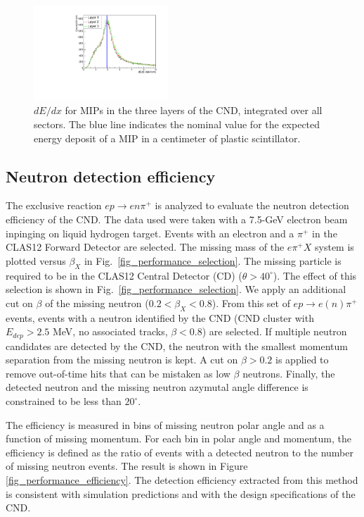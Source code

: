 \begin{figure}[htb]  
\begin{center}
\includegraphics[width=0.45\textwidth]{Figure/canENE.pdf}
\caption {$dE/dx$ for MIPs in the three layers of the CND, integrated over all sectors. The blue line indicates the nominal value for the expected energy deposit of a MIP in a centimeter of plastic scintillator.}
\label{fig_performance_edep}
\end{center}
\end{figure}

\subsection{Neutron detection efficiency}
The exclusive reaction $e p \rightarrow e n \pi^+$ is analyzed to evaluate the neutron detection efficiency of the CND. The data used were taken with a 7.5-GeV electron beam inpinging on liquid hydrogen target. Events with an electron and a $\pi^+$ in the CLAS12 Forward Detector are selected. The missing mass of the $e \pi^+ X$ system is plotted versus $\beta_X$ in Fig.~\ref{fig_performance_selection}. The missing particle is required to be in the CLAS12 Central Detector (CD) ($\theta>40^\circ$). The effect of this selection is shown in Fig.~\ref{fig_performance_selection}. We apply an additional cut on $\beta$ of the missing neutron ($0.2<\beta_X<0.8$). From this set of $e p \rightarrow e (n) \pi^+$ events, events with a neutron identified by the CND (CND cluster with $E_{dep}>2.5$ MeV, no associated tracks, $\beta<0.8$) are selected. If multiple neutron candidates are detected by the CND, the neutron with the smallest momentum separation from the missing neutron is kept. A cut on $\beta>0.2$ is applied to remove out-of-time hits that can be mistaken as low $\beta$ neutrons. Finally, the detected neutron and the missing neutron azymutal angle difference is constrained to be less than $20^\circ$.

The efficiency is measured in bins of missing neutron polar angle and as a function of missing momentum. For each bin in polar angle and momentum, the efficiency is defined as the ratio of events with a detected neutron to the number of missing neutron events. The result is shown in Figure \ref{fig_performance_efficiency}. The detection efficiency extracted from this method is consistent with simulation predictions and with the design specifications of the CND.

